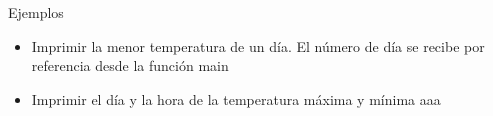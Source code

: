 \documentclass[xcolor=pdftex,table,11pt]{beamer}
\begin{document}
\begin{frame}[allowframebreaks]{Ejemplos}
\begin{enumerate}
\begin{itemize}
          \item Imprimir la menor temperatura de un día. El número de día se recibe por referencia desde la función main
          
          \item Imprimir el día y la hora de la temperatura máxima y mínima aaa

     
      \end{itemize}
\href{https://github.com/danis963/informaticaI_IUA/blob/main/c/src/7-funcion_triangulo.c}{}


\end{enumerate}

\end{frame}
\end{document}

